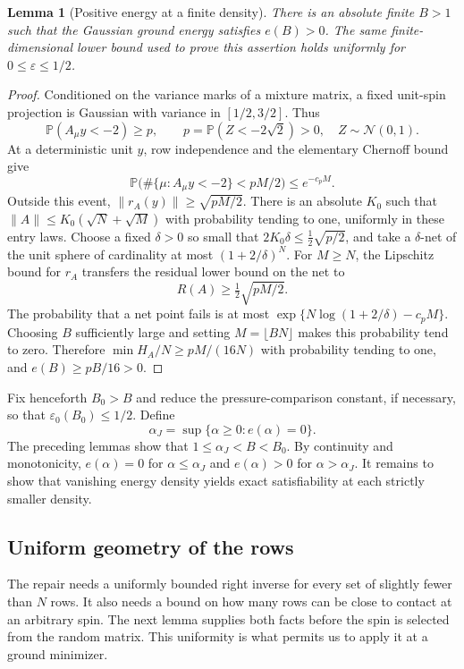 \documentclass[11pt,a4paper]{article}
\numberwithin{equation}{section}
\newtheorem{lemma}[theorem]{Lemma}
\theoremstyle{definition}
\theoremstyle{remark}
\newcommand{\Prob}{\mathbb P}
\newcommand{\eps}{\varepsilon}
\begin{document}
\begin{lemma}[Positive energy at a finite density]
\label{thresh:large-density}
There is an absolute finite $B>1$ such that the Gaussian ground energy
satisfies $e(B)>0$.  The same finite-dimensional lower bound used to
prove this assertion holds uniformly for $0\leq\eps\leq1/2$.
\end{lemma}

\begin{proof}
Conditioned on the variance marks of a mixture matrix, a fixed unit-spin
projection is Gaussian with variance in $[1/2,3/2]$.  Thus
\[
 \Prob(A_\mu y<-2)\geq p,
 \qquad p=\Prob(Z<-2\sqrt2)>0,
 \quad Z\sim\mathcal N(0,1).
\]
At a deterministic unit $y$, row independence and the elementary
Chernoff bound give
\[
 \Prob\bigl(\#\{\mu:A_\mu y<-2\}<pM/2\bigr)
 \leq e^{-c_pM}.
\]
Outside this event, $\|r_A(y)\|\geq\sqrt{pM/2}$.
There is an absolute $K_0$ such that
$\|A\|\leq K_0(\sqrt N+\sqrt M)$ with probability tending to one,
uniformly in these entry laws.  Choose a fixed
$\delta>0$ so small that $2K_0\delta\leq\frac12\sqrt{p/2}$, and take a
$\delta$-net of the unit sphere of cardinality at most
$(1+2/\delta)^N$.  For $M\geq N$, the Lipschitz bound for $r_A$ transfers
the residual lower bound on the net to
\[
 R(A)\geq\tfrac12\sqrt{pM/2}.
\]
The probability that a net point fails is at most
$\exp\{N\log(1+2/\delta)-c_pM\}$.  Choosing $B$ sufficiently large and
setting $M=\lfloor BN\rfloor$ makes this probability tend to zero.
Therefore $\min H_A/N\geq pM/(16N)$ with probability tending to one, and
$e(B)\geq pB/16>0$.
\end{proof}

Fix henceforth $B_0>B$ and reduce the pressure-comparison constant, if
necessary, so that $\eps_0(B_0)\leq1/2$.  Define
\begin{equation}
 \alpha_J=\sup\{\alpha\geq0:e(\alpha)=0\}.
 \label{thresh:eq:threshold-definition}
\end{equation}
The preceding lemmas show that $1\leq\alpha_J<B<B_0$.  By continuity
and monotonicity, $e(\alpha)=0$ for $\alpha\leq\alpha_J$ and
$e(\alpha)>0$ for $\alpha>\alpha_J$.  It remains to show that vanishing
energy density yields exact satisfiability at each strictly smaller
density.

\subsection{Uniform geometry of the rows}

The repair needs a uniformly bounded right inverse for every set of
slightly fewer than $N$ rows.  It also needs a bound on how many rows
can be close to contact at an arbitrary spin.  The next lemma supplies
both facts before the spin is selected from the random matrix.  This
uniformity is what permits us to apply it at a ground minimizer.
\end{document}
